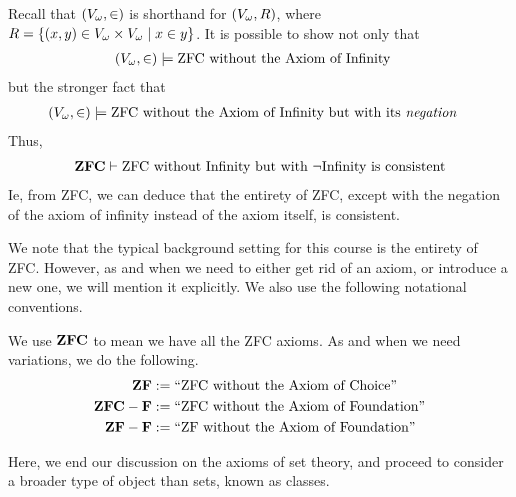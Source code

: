 \begin{remark}
    Recall that $\left( V_{\omega}, \in \right)$ is shorthand for $\left( V_{\omega}, R \right)$, where $R = \left\{ \left( x, y \right) \in V_{\omega} \times V_{\omega} \; \middle\vert \; x \in y \right\}$. It is possible to show not only that
    \begin{align*}
        \left( V_{\omega}, \in \right) &\models \text{ZFC without the Axiom of Infinity}
    \end{align*}
    but the stronger fact that
    \begin{align*}
        \left( V_{\omega}, \in \right) &\models \text{ZFC without the Axiom of Infinity but with its \textit{negation}}
    \end{align*}
    Thus,
    \begin{align*}
        \mathbf{ZFC} \vdash \text{ZFC without Infinity but with $\neg\text{Infinity}$ is consistent}
    \end{align*}
    Ie, from ZFC, we can deduce that the entirety of ZFC, except with the negation of the axiom of infinity instead of the axiom itself, is consistent.
\end{remark}

We note that the typical background setting for this course is the entirety of ZFC. However, as and when we need to either get rid of an axiom, or introduce a new one, we will mention it explicitly. We also use the following notational conventions.

\begin{boxnotation}
    We use $\mathbf{ZFC}$ to mean we have all the ZFC axioms. As and when we need variations, we do the following.
    \begin{align*}
        \mathbf{ZF} &:= \text{``ZFC without the Axiom of Choice''} \\
        \mathbf{ZFC} - \mathbf{F} &:= \text{``ZFC without the Axiom of Foundation''} \\
        \mathbf{ZF} - \mathbf{F} &:= \text{``ZF without the Axiom of Foundation''}
    \end{align*}
\end{boxnotation}

Here, we end our discussion on the axioms of set theory, and proceed to consider a broader type of object than sets, known as classes.